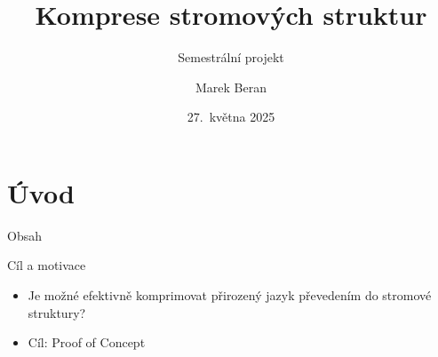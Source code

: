 \documentclass[lualatex,hyperref={pdfencoding=auto}]{beamer}
\title[Komprese stromových struktur]{Komprese stromových struktur}
\subtitle{Semestrální projekt}
\author{Marek Beran}
\institute[VŠB-TUO]{VŠB -- Technická univerzita Ostrava\\\vspace{2mm}marek.beran.st@vsb.cz}
\date[27.~5.~2025]{27.~května 2025}
\begin{document}
\section{Úvod}

\begin{frame}{Obsah}
    \tableofcontents
\end{frame}

\begin{frame}{Cíl a motivace}

\begin{itemize}
    \item Je možné efektivně komprimovat přirozený jazyk převedením do stromové struktury?
    \item Cíl: Proof of Concept
\end{itemize}
\end{frame}

            
\end{document}

